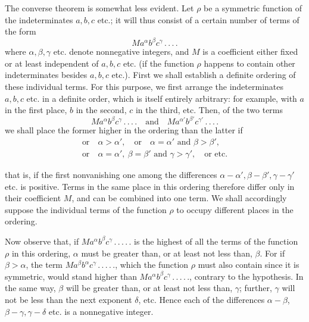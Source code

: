 The converse theorem is somewhat less evident. Let $\rho$ be a symmetric function of the indeterminates $a,b,c$ etc.; it will thus consist of a certain number of terms of the form
\[
Ma^\alpha b^\beta c^\gamma\, .\, .\, .\, .
\]
where $\alpha,\beta,\gamma$ etc. denote nonnegative integers, and $M$ is a coefficient either fixed or at least independent of $a,b,c$ etc. (if the function $\rho$ happens to contain other indeterminates besides $a,b,c$ etc.). First we shall establish a definite ordering of these individual terms. For this purpose, we first arrange the indeterminates $a,b,c$ etc. in a definite order, which is itself entirely arbitrary: for example, with $a$ in the first place, $b$ in the second, $c$ in the third, etc. Then, of the two terms
\[
Ma^\alpha b^\beta c^\gamma\, .\, .\, .\, .\quad\text{and}\quad Ma^{\alpha'}b^{\beta'}c^{\gamma'}\, .\, .\, .\, .
\]
we shall place the former higher in the ordering than the latter if
\[
\begin{gathered}\text{or}\quad\alpha>\alpha',\quad\text{or}\quad\alpha=\alpha'\text{ and }\beta>\beta',\\\text{or}\quad\alpha=\alpha',\ \beta=\beta'\text{ and }\gamma>\gamma',\quad\text{or etc.}\end{gathered}
\]

that is, if the first nonvanishing one among the differences $\alpha-\alpha',\beta-\beta',\gamma-\gamma'$ etc. is positive. Terms in the same place in this ordering therefore differ only in their coefficient $M$, and can be combined into one term. We shall accordingly suppose the individual terms of the function $\rho$ to occupy different places in the ordering.

Now observe that, if $Ma^\alpha b^\beta c^\gamma\, .\, .\, .\, .\, .$ is the highest of all the terms of the function $\rho$ in this ordering, $\alpha$ must be greater than, or at least not less than, $\beta$. For if $\beta>\alpha$, the term $Ma^\beta b^\alpha c^\gamma\, .\, .\, .\, .\, .$, which the function $\rho$ must also contain since it is symmetric, would stand higher than $Ma^\alpha b^\beta c^\gamma\, .\, .\, .\, .\, .$, contrary to the hypothesis. In the same way, $\beta$ will be greater than, or at least not less than, $\gamma$; further, $\gamma$ will not be less than the next exponent $\delta$, etc. Hence each of the differences $\alpha-\beta$, $\beta-\gamma,\gamma-\delta$ etc. is a nonnegative integer.


